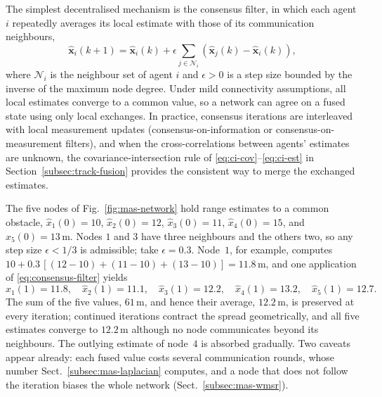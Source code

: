 The simplest decentralised mechanism is the consensus filter, in which each agent $i$ repeatedly averages its local estimate with those of its communication neighbours,
\begin{equation}
\widehat{\mathbf{x}}_i(k+1)=\widehat{\mathbf{x}}_i(k)+\epsilon\sum_{j\in\mathcal{N}_i}\left(\widehat{\mathbf{x}}_j(k)-\widehat{\mathbf{x}}_i(k)\right),
\label{eq:consensus-filter}
\end{equation}
where $\mathcal{N}_i$ is the neighbour set of agent $i$ and $\epsilon>0$ is a step size bounded by the inverse of the maximum node degree. Under mild connectivity assumptions, all local estimates converge to a common value, so a network can agree on a fused state using only local exchanges. In practice, consensus iterations are interleaved with local measurement updates (consensus-on-information or consensus-on-measurement filters), and when the cross-correlations between agents' estimates are unknown, the covariance-intersection rule of \eqref{eq:ci-cov}--\eqref{eq:ci-est} in Section~\ref{subsec:track-fusion} provides the consistent way to merge the exchanged estimates.



\begin{example}
\label{ex:mas-network-consensus}
The five nodes of Fig.~\ref{fig:mas-network} hold range estimates to a common obstacle, $\widehat{x}_1(0)=10$, $\widehat{x}_2(0)=12$, $\widehat{x}_3(0)=11$, $\widehat{x}_4(0)=15$, and $\widehat{x}_5(0)=13$\,m. Nodes $1$ and $3$ have three neighbours and the others two, so any step size $\epsilon<1/3$ is admissible; take $\epsilon=0.3$. Node~$1$, for example, computes $10+0.3\,[(12-10)+(11-10)+(13-10)]=11.8$\,m, and one application of \eqref{eq:consensus-filter} yields
\begin{equation*}
\widehat{x}_1(1)=11.8,\quad \widehat{x}_2(1)=11.1,\quad \widehat{x}_3(1)=12.2,\quad \widehat{x}_4(1)=13.2,\quad \widehat{x}_5(1)=12.7 .
\end{equation*}
The sum of the five values, $61$\,m, and hence their average, $12.2$\,m, is preserved at every iteration; continued iterations contract the spread geometrically, and all five estimates converge to $12.2$\,m although no node communicates beyond its neighbours. The outlying estimate of node~$4$ is absorbed gradually. Two caveats appear already: each fused value costs several communication rounds, whose number Sect.~\ref{subsec:mas-laplacian} computes, and a node that does not follow the iteration biases the whole network (Sect.~\ref{subsec:mas-wmsr}).
\end{example}

